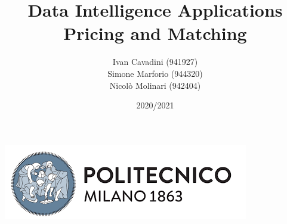 \begin{titlepage}
        \title{Data Intelligence Applications\\Pricing and Matching}
		\date{2020/2021}
        \author{Ivan Cavadini (941927)\\Simone Marforio (944320)\\Nicolò Molinari (942404)}
		\maketitle
		\begin{center}
			\includegraphics[scale=0.5]{Images/PolimiLogo}
		\end{center}
\end{titlepage}